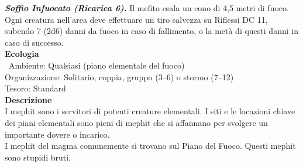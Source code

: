 \begin{multicols}{2}
\emph{\textbf{Soffio Infuocato (Ricarica 6).}} Il mefito esala un cono di 4,5 metri di fuoco. Ogni creatura nell'area deve effettuare un tiro salvezza su Riflessi DC 11, subendo 7 (2d6) danni da fuoco in caso di fallimento, o la metà di questi danni in caso di successo.\\
\textbf{Ecologia}\\\
Ambiente: Qualsiasi (piano elementale del fuoco)\\
Organizzazione: Solitario, coppia, gruppo (3–6) o stormo (7–12)\\
Tesoro: Standard\\
\textbf{Descrizione}\\
I mephit sono i servitori di potenti creature elementali. I siti e le locazioni chiave dei piani elementali sono pieni di mephit che si affannano per svolgere un importante dovere o incarico.\\
I mephit del magma comunemente si trovano sul Piano del Fuoco. Questi mephit sono stupidi bruti.\\



\end{multicols}
